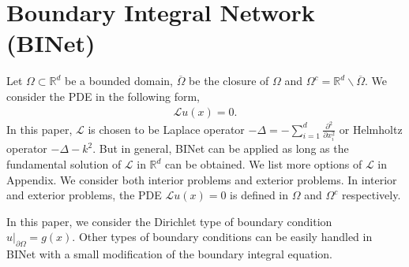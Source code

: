 \documentclass[hyperref]{article}
\numberwithin{equation}{section}
\theoremstyle{nonumberplain}
\begin{document}
	
	
	
	
	
	
	
	
	
	
	
	
	
	
	
	
	
	
	
	
	
	\section{Boundary Integral Network (BINet)}\label{sec:BINet}
	Let 
	$\Omega\subset\mathbb{R}^d$ be a bounded domain, $\overline{\Omega}$ be the closure of $\Omega$ and $\Omega^c=\mathbb{R}^d\backslash \overline{\Omega}$.
	We consider the PDE in the following form,
	\begin{equation}
		\begin{aligned}
			\mathcal{L}u(x) = 0.
			\label{main_eq}
		\end{aligned}
	\end{equation}
	In this paper, $\mathcal{L}$ is chosen to be Laplace operator $ -\Delta=-\sum_{i=1}^d\frac{\partial^2}{\partial x_i^2}$ or Helmholtz operator $-\Delta-k^2$. But in general, BINet can be applied as long as the fundamental solution of $\mathcal{L}$ in $\mathbb{R}^d$ can be obtained. We list more options of $\mathcal{L}$ in Appendix.
	We consider both interior problems and exterior problems. In interior and exterior problems, the PDE $\mathcal{L}u(x) = 0$ is defined in $\Omega$ and $\Omega^c$ respectively.
	
	In this paper, we consider the Dirichlet type of boundary condition $ u|_{\partial\Omega}=g(x).$ Other types of boundary conditions can be easily handled in BINet with a small modification of the boundary integral equation. 
	
	
	
\end{document}
